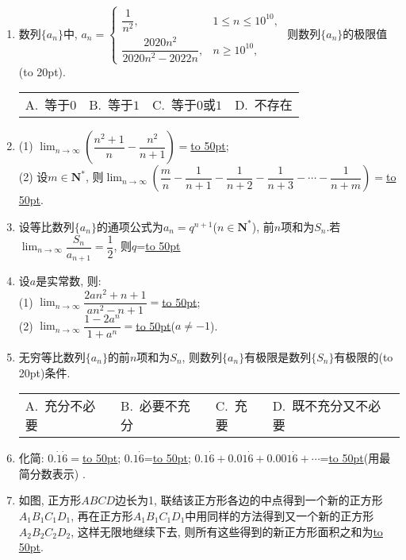 \documentclass[10pt,a4paper]{article}
\newcommand{\blank}[1]{\underline{\hbox to #1pt{}}}
\newcommand{\bracket}[1]{(\hbox to #1pt{})}
\newcommand{\fourch}[4]{\par\begin{tabular}{p{.23\textwidth}p{.23\textwidth}p{.23\textwidth}p{.23\textwidth}}
A.~#1 &B.~#2& C.~#3& D.~#4
\end{tabular}}
\begin{document}
\begin{enumerate}[1.]
\item 数列$\{a_n\}$中, $a_n=\begin{cases}\dfrac 1{n^2}, & 1\le n\le 10^{10},  \\ \dfrac{2020n^2}{2020n^2-2022n}, & n\ge 10^{10},\end{cases}$ 则数列$\{a_n\}$的极限值\bracket{20}.
\fourch{等于$0$}{等于$1$}{等于$0$或$1$}{不存在}
\item (1) $\displaystyle\lim_{n\to \infty}(\dfrac{n^2+1}n-\dfrac{n^2}{n+1})=$\blank{50};\\
(2) 设$m\in \mathbf{N}^*$, 则$\displaystyle\lim_{n\to \infty}(\dfrac mn-\dfrac 1{n+1}-\dfrac 1{n+2}-\dfrac 1{n+3}-\cdots -\dfrac 1{n+m})=$\blank{50}.
\item 设等比数列$\{a_n\}$的通项公式为$a_n={q^{n+1}}$($n\in \mathbf{N}^*$), 前$n$项和为$S_n$.若$\displaystyle\lim_{n\to \infty}\dfrac {S_n}{a_{n+1}}=\dfrac 12$, 则$q$=\blank{50}
 \item 设$a$是实常数, 则:\\
(1) $\displaystyle\lim_{n\to \infty}\dfrac{2an^2+n+1}{an^2-n+1}=$\blank{50};\\
(2) $\displaystyle\lim_{n\to \infty}\dfrac{1-2a^n}{1+a^n}=$\blank{50}($a\ne -1$).
\item 无穷等比数列$\{a_n\}$的前$n$项和为$S_n$, 则数列$\{a_n\}$有极限是数列$\{S_n\}$有极限的\bracket{20}条件.
\fourch{充分不必要}{必要不充分}{充要}{既不充分又不必要}
\item 化简: $0.\dot1\dot6=$\blank{50}; $0.1\dot6$=\blank{50};
 $0.1\dot6+0.01\dot6+0.001\dot6+\cdots$=\blank{50}(用最简分数表示)
. 
\item 如图, 正方形$ABCD$边长为1, 联结该正方形各边的中点得到一个新的正方形$A_1B_1C_1D_1$, 再在正方形$A_1B_1C_1D_1$中用同样的方法得到又一个新的正方形$A_2B_2C_2D_2$, 这样无限地继续下去, 则所有这些得到的新正方形面积之和为\blank{50}.
\begin{center}
\end{center}
\end{enumerate}
\end{document}
